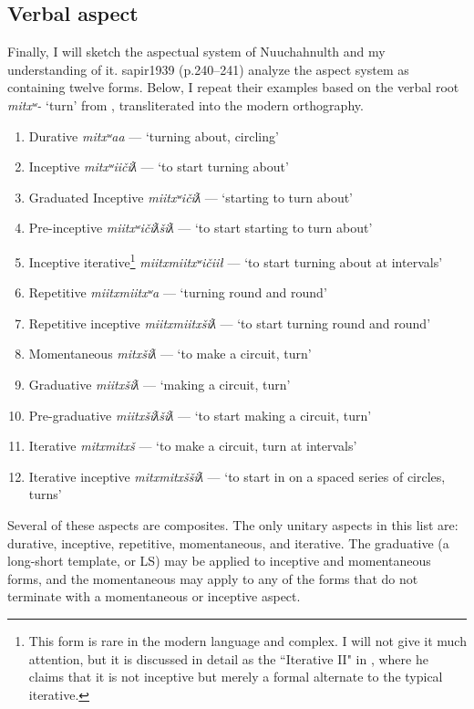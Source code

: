 \subsection{Verbal aspect} \label{ch:clause:aspect}

Finally, I will sketch the aspectual system of Nuuchahnulth and my understanding of it. {sapir1939} (p.240--241) analyze the aspect system as containing twelve forms. Below, I repeat their examples based on the verbal root \textit{mitxʷ-} `turn' from \citeauthor{sapir1939},  transliterated into the modern orthography.

\begin{enumerate}[noitemsep]
\item Durative \textit{mitxʷaa} --- `turning about, circling'
\item Inceptive \textit{mitxʷiičiƛ} --- `to start turning about'
\item Graduated Inceptive \textit{miitxʷičiƛ} --- `starting to turn about'
\item Pre-inceptive \textit{miitxʷičiƛšiƛ} --- `to start starting to turn about'
\item Inceptive iterative\footnote{This form is rare in the modern language and complex. I will not give it much attention, but it is discussed in detail as the ``Iterative II" in \citealt[242--244]{davidson2002}, where he claims that it is not inceptive but merely a formal alternate to the typical iterative.} \textit{miitxmiitxʷičiił} --- `to start turning about at intervals'
\item Repetitive \textit{miitxmiitxʷa} --- `turning round and round'
\item Repetitive inceptive \textit{miitxmiitxšiƛ} --- `to start turning round and round'
\item Momentaneous \textit{mitxšiƛ} --- `to make a circuit, turn'
\item Graduative \textit{miitxšiƛ} --- `making a circuit, turn'
\item Pre-graduative \textit{miitxšiƛšiƛ} --- `to start making a circuit, turn'
\item Iterative \textit{mitxmitxš} --- `to make a circuit, turn at intervals'
\item Iterative inceptive \textit{mitxmitxššiƛ} --- `to start in on a spaced series of circles, turns'
\end{enumerate}

Several of these aspects are composites. The only unitary aspects in this list are: durative, inceptive, repetitive, momentaneous, and iterative. The graduative (a long-short template, or LS) may be applied to inceptive and momentaneous forms, and the momentaneous may apply to any of the forms that do not terminate with a momentaneous or inceptive aspect.

